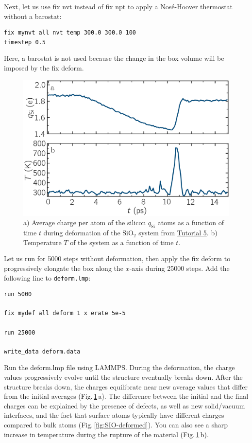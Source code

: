 \documentclass[9pt,tutorial]{livecoms}
\newcommand{\lmpcmd}[1]{\hspace{0pt}\colorbox{listing}{\textcolor{command}{\small{#1}}}\hspace{0pt}} %
\newcommand{\flecmd}[1]{\textcolor{command}{\texttt{#1}}} %
\begin{document}
Next, let us use \lmpcmd{fix nvt} instead of \lmpcmd{fix npt} to apply a
Nosé-Hoover thermostat without a barostat:
\begin{lstlisting}
fix mynvt all nvt temp 300.0 300.0 100
timestep 0.5
\end{lstlisting}
Here, a barostat is not used because the change in the box volume will be imposed
by the \lmpcmd{fix deform}.

\begin{figure}
\includegraphics[width=\linewidth]{SIO-deformed-charge}
\caption{a) Average charge per atom of the silicon $q_\text{Si}$ atoms as
a function of time $t$ during deformation of the $\text{SiO}_2$ system
from \hyperref[reactive-silicon-dioxide-label]{Tutorial 5}.  b) Temperature $T$ of the
system as a function of time $t$.}
\label{fig:SIO-deformed-charge}
\end{figure}

Let us run for 5000 steps without deformation, then apply the \lmpcmd{fix deform}
to progressively elongate the box along the $x$-axis during 25000 steps.  Add
the following line to \flecmd{deform.lmp}:
\begin{lstlisting}
run 5000

fix mydef all deform 1 x erate 5e-5

run 25000

write_data deform.data
\end{lstlisting}
Run the \lmpcmd{deform.lmp} file using LAMMPS.  During the deformation, the charge
values progressively evolve until the structure eventually breaks down.  After the
structure breaks down, the charges equilibrate near new average values that differ
from the initial averages (Fig.\,\ref{fig:SIO-deformed-charge}\,a).  The difference
between the initial and the final charges can be explained by the presence of
defects, as well as new solid/vacuum interfaces, and the fact that surface atoms
typically have different charges compared to bulk atoms (Fig.\,\ref{fig:SIO-deformed}).
You can also see a sharp increase in temperature during the rupture of
the material (Fig.\,\ref{fig:SIO-deformed-charge}\,b).
\end{document}
